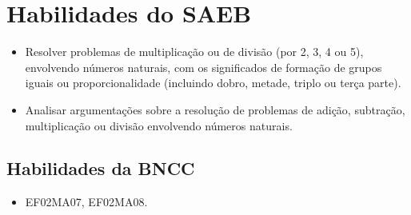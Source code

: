 \vspace*{-1.5cm}

\section*{Habilidades do SAEB}

\begin{itemize}
\item Resolver problemas de multiplicação ou de divisão (por 2, 3, 4 ou 5),
envolvendo números naturais, com os significados de formação de grupos
iguais ou proporcionalidade (incluindo dobro, metade, triplo ou terça
parte).

\item Analisar argumentações sobre a resolução de problemas de adição,
subtração, multiplicação ou divisão envolvendo números naturais.
\end{itemize}

\subsection{Habilidades da BNCC}

\begin{itemize}
	\item EF02MA07, EF02MA08.
\end{itemize}

